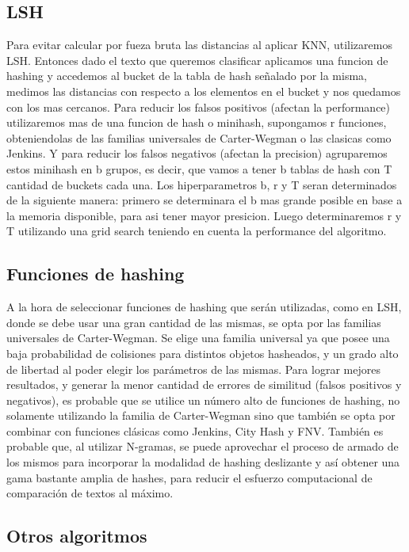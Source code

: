 \documentclass[a4paper,10pt]{article}
\begin{document}
	
	\subsection{LSH}
	
	Para evitar calcular por fueza bruta las distancias al aplicar KNN, utilizaremos LSH. Entonces dado el texto que queremos clasificar aplicamos una funcion de hashing y accedemos al bucket de la tabla de hash se\~{n}alado por la misma, medimos las distancias con respecto a los elementos en el bucket y nos quedamos con los mas cercanos. Para reducir los falsos positivos (afectan la performance) utilizaremos mas de una funcion de hash o minihash, supongamos r funciones, obteniendolas de las familias universales de Carter-Wegman o las clasicas como Jenkins. Y para reducir los falsos negativos (afectan la precision) agruparemos estos minihash en b grupos, es decir, que vamos a tener b tablas de hash con T cantidad de buckets cada una.
	 Los hiperparametros b, r y T seran determinados de la siguiente manera: primero se determinara el b mas grande posible en base a la memoria disponible, para asi tener mayor presicion. Luego determinaremos r y T utilizando una grid search teniendo en cuenta la performance del algoritmo.

	
	\subsection{Funciones de hashing}

	A la hora de seleccionar funciones de hashing que ser\'{a}n utilizadas, como en LSH, donde se debe usar una gran cantidad de las mismas, se opta por las familias universales de Carter-Wegman. Se elige una familia universal ya que posee una baja probabilidad de colisiones para distintos objetos hasheados, y un grado alto de libertad al poder elegir los par\'{a}metros de las mismas. Para lograr mejores resultados, y generar la menor cantidad de errores de similitud (falsos positivos y negativos), es probable que se utilice un n\'{u}mero alto de funciones de hashing, no solamente utilizando la familia de Carter-Wegman sino que tambi\'{e}n se opta por combinar con funciones cl\'{a}sicas como Jenkins, City Hash y FNV.
	Tambi\'{e}n es probable que, al utilizar N-gramas, se puede aprovechar el proceso de armado de los mismos para incorporar la modalidad de hashing deslizante y as\'{i} obtener una gama bastante amplia de hashes, para reducir el esfuerzo computacional de comparaci\'{o}n de textos al m\'{a}ximo.

	\subsection{Otros algoritmos}
\end{document}
